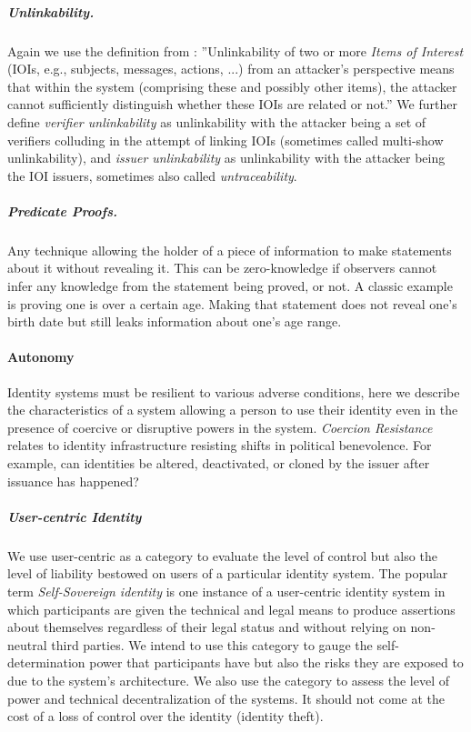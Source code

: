 \subparagraph{Unlinkability.} Again we use the definition from \cite{ph10}: ''Unlinkability of two or more \emph{Items of Interest} (IOIs, e.g., subjects, messages, actions, ...)
from an attacker’s perspective means that within the system (comprising these and
possibly other items), the attacker cannot sufficiently distinguish whether these IOIs are
related or not.''
We further define \emph{verifier unlinkability} as unlinkability with the attacker being a set of verifiers colluding in the attempt of linking IOIs (sometimes called multi-show unlinkability), and \emph{issuer unlinkability} as unlinkability with the attacker being the IOI issuers, sometimes also called \emph{untraceability}.


\subparagraph{Predicate Proofs.} Any technique allowing the holder of a piece of information to make statements about it without revealing it. This can be zero-knowledge if observers cannot infer any knowledge from the statement being proved, or not. A classic example is proving one is over a certain age. Making that statement does not reveal one's birth date but still leaks information about one's age range.


\paragraph{Autonomy} Identity systems must be resilient to various adverse conditions, here we describe the characteristics of a system allowing a person to use their identity even in the presence of coercive or disruptive powers in the system. \emph{Coercion Resistance} relates to identity infrastructure resisting shifts in political benevolence. For example, can identities be altered, deactivated, or cloned by the issuer after issuance has happened?


\subparagraph{User-centric Identity} We use user-centric as a category to evaluate the level of control but also the level of liability bestowed on users of a particular identity system. The popular term \emph{Self-Sovereign identity} is one instance of a user-centric identity system in which participants are given the technical and legal means to produce assertions about themselves regardless of their legal status and without relying on non-neutral third parties. We intend to use this category to gauge the self-determination power that participants have but also the risks they are exposed to due to the system's architecture. We also use the category to assess the level of power and technical decentralization of the systems. It should not come at the cost of a loss of control over the identity (identity theft).

